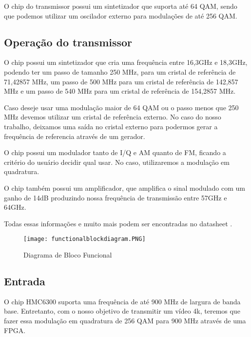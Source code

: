 O chip do transmissor possui um sintetizador que suporta até 64 QAM, sendo que podemos utilizar um oscilador externo para modulações de até 256 QAM.

\subsection{Operação do transmissor}

O chip possui um sintetizador que cria uma frequência entre 16,3GHz e 18,3GHz, podendo ter um passo de tamanho 250 MHz, para um cristal de referência de 71,42857 MHz, um passo de 500 MHz para um cristal de referência de 142,857 MHz e um passo de 540 MHz para um cristal de referência de 154,2857 MHz.

Caso deseje usar uma modulação maior de 64 QAM ou o passo menos que 250 MHz devemos utilizar um cristal de referência externo. No caso do nosso trabalho, deixamos uma saída no cristal externo para podermos gerar a frequência de referencia através de um gerador.

O chip possui um modulador tanto de I/Q e AM quanto de FM, ficando a critério do usuário decidir qual usar. No caso, utilizaremos a modulação em quadratura. 

O chip também possui um amplificador, que amplifica o sinal modulado com um ganho de 14dB produzindo nossa frequência de transmissão entre 57GHz e 64GHz.

Todas essas informações e muito mais podem ser encontradas no datasheet \cite{hmc6300}.

\begin{figure}[htbp]
            \centering
            \caption{Diagrama de Bloco Funcional}
            \texttt{[image: functionalblockdiagram.PNG]}
            
            \centering
            \label{hmc6300}
        \end{figure}

\subsection{Entrada}

O chip HMC6300 suporta uma frequência de até 900 MHz de largura de banda base. Entretanto, com o nosso objetivo de transmitir um vídeo 4k, teremos que fazer essa modulação em quadratura de 256 QAM para 900 MHz através de uma FPGA.

